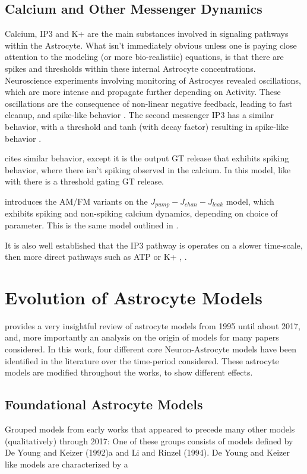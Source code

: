     \subsection{Calcium and Other Messenger Dynamics}
    Calcium, IP3 and K+ are the main substances involved in signaling pathways
    within the Astrocyte. What isn't immediately obvious unless one is paying
    close attention to the modeling (or more bio-realistiic) equations, is that
    there are spikes and thresholds within these internal Astrocyte
    concentrations. Neuroscience experiments involving monitoring of Astrocyes
    revealed oscillations, which are more intense and propagate further
    depending on Activity. These oscillations are the consequence of non-linear
    negative feedback, leading to fast cleanup, and spike-like behavior
    \cite{postnov_2009}. The second messenger IP3 has a similar behavior, with a
    threshold and tanh (with decay factor) resulting in spike-like behavior
    \cite{postnov_2009}.

    \cite{wade_2011} cites similar behavior, except it is the output GT release
    that exhibits spiking behavior, where there isn't spiking observed in the
    calcium. In this model, like with \cite{postnov_2009} there is a threshold
    gating GT release.

    \cite{pitta_2009} introduces the AM/FM variants on the $J_{pump} - J_{chan}
    - J_{leak}$ model, which exhibits spiking and non-spiking calcium dynamics,
    depending on choice of parameter. This is the same model outlined in \cite{wade_2011}.

    It is also well established that the IP3 pathway is operates
    on a slower time-scale, then more direct pathways such as ATP or K+
    \cite{postnov_2009}, \cite{bassam_2015}.


    \section{Evolution of Astrocyte Models}
    \cite{manninen_2018} provides a very insightful review of astrocyte models
    from 1995 until about 2017, and, more importantly an analysis on the origin
    of models for many papers considered. In this work, four different core
    Neuron-Astrocyte models have been identified in the literature over the
    time-period considered. These astrocyte models are modified throughout the
    works, to show different effects.

    \subsection{Foundational Astrocyte Models}
    \cite{manninen_2018} Grouped models from early works that appeared to
    precede many other models (qualitatively) through 2017: One of these groups
    consists of models defined by De Young and Keizer (1992)a and Li and Rinzel
    (1994). De Young and Keizer like models are characterized by a 
    
